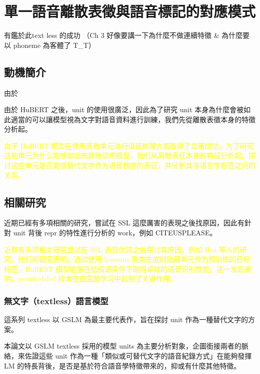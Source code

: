 % 

\chapter{單一語音離散表徵與語音標記的對應模式}


有鑑於此text less 的成功
（Ch 3 好像要講一下為什麼不做連續特徵 \& 為什麼要以 phoneme 為客體了 T\_T） 

\section{動機簡介}  %

由於


由於 HuBERT 之後，unit 的使用很廣泛，因此為了研究 unit 本身為什麼會被如此適當的可以讓模型視為文字對語音資料進行訓練，我們先從離散表徵本身的特徵分析起。 

\textcolor{yellow}{由于 HuBERT 模型在使用离散单元进行语音处理方面取得了显著成功，为了研究这些单元为什么能够如此有效地训练模型，我们从离散表征本身的特征分析起。探讨这些单元是否能够替代文字作为语音数据的表征，并分析其与语言学标签之间的关系。 }


\section{相關研究}

近期已經有多項相關的研究，嘗試在 SSL 這麼厲害的表現之後找原因，因此有針對 unit 背後 repr 的特性進行分析的 work，例如 CITEUSPLEASE。 

\textcolor{yellow}{近期有多项相关研究尝试在 SSL 表现优异之后探讨其原因，例如 Hsu 等人的研究。他们的研究表明，通过使用 k-means 聚类生成的隐藏单元作为预训练的目标标签，HuBERT 模型能够在低资源条件下取得卓越的语音识别性能。这一发现表明，pseudo-label 技术在自监督学习中起到了关键作用。}



\subsection{無文字（textless）語言模型}

這系列 textless 以 GSLM 為最主要代表作，旨在探討 unit 作為一種替代文字的方案。

本論文以 GSLM textless 採用的模型 units 為主要分析對象，企圖銜接兩者的脈絡，來佐證這些 unit 作為一種「類似或可替代文字的語音紀錄方式」在能夠發揮 LM 的特長背後，是否是基於符合語音學特徵帶來的，抑或有什麼其他特徵。


